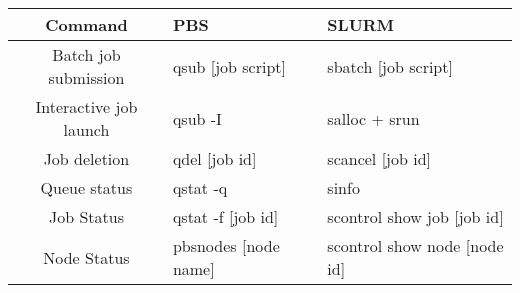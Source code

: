 \small
\begin{tabularx}{\textwidth}{c|X|X}
\toprule
{\bf Command} & {\bf PBS} & {\bf SLURM}  \\
\midrule

Batch job submission &
qsub [job script] &
sbatch [job script]
\\ \hline

Interactive job launch &
qsub -I &
salloc + srun
\\ \hline

Job deletion &
qdel [job id] &
scancel [job id]
\\ \hline

Queue status &
qstat -q &
sinfo
\\ \hline

Job Status &
qstat -f [job id] &
scontrol show job [job id]
\\ \hline

Node Status &
pbsnodes [node name] &
scontrol show node [node id]
\\ \hline

\bottomrule
\end{tabularx}



